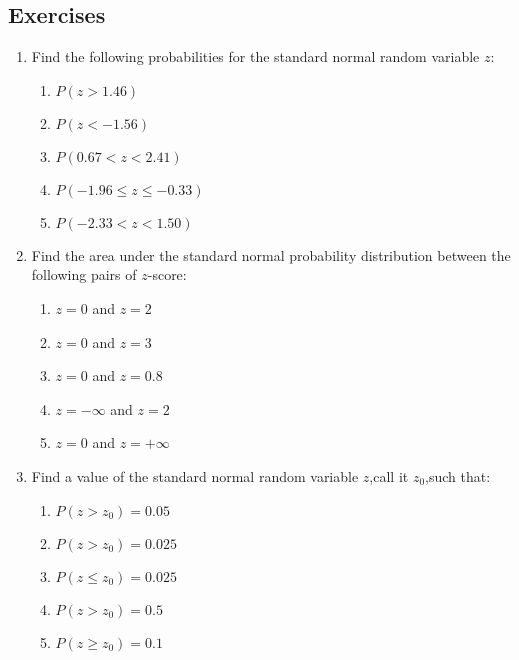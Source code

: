 \subsection{Exercises} 
\begin{enumerate}
\item  Find the following probabilities for the standard normal random variable $z$:
 
\begin{enumerate}
\item $P(z>1.46)$
\item $P(z<-1.56)$
\item $P(0.67<z<2.41)$
\item $P(-1.96\leq z \leq -0.33)$
\item $P(-2.33<z<1.50)$
\end{enumerate}

\item Find the area under the standard normal probability distribution between the following pairs of $z$-score:

\begin{enumerate}
\item $z=0$ and $z=2$
\item $z=0$ and $z=3$
\item $z=0$ and $z=0.8$
\item $z=-\infty$ and $z=2$
\item $z=0$ and $z=+\infty$
\end{enumerate}

\item Find a value of the standard normal random variable $z$,call it $z_{0}$,such that:

\begin{enumerate}
\item $P(z>z_{0})=0.05$
\item $P(z>z_{0})=0.025$
\item $P(z\leq z_{0})=0.025$
\item $P(z>z_{0})=0.5$
\item $P(z\geq z_{0})=0.1$
\end{enumerate}


\end{enumerate}